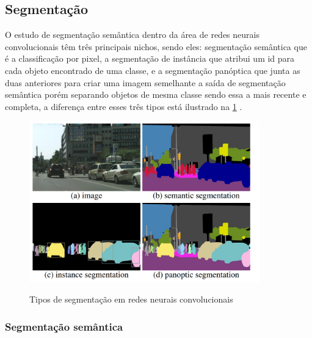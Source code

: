 \subsection{Segmentação}

O estudo de segmentação semântica dentro da área de redes neurais convolucionais têm três principais nichos, sendo eles: segmentação semântica que é a classificação por pixel, a segmentação de instância que atribui um id para cada objeto encontrado de uma classe, e a segmentação panóptica que junta as duas anteriores para criar uma imagem semelhante a saída de segmentação semântica porém separando objetos de mesma classe sendo essa a mais recente e completa, a diferença entre esses três tipos está ilustrado na \cref{fig:segentacoes} \cite{dp_semantic_segmantation, lapix}. 

\begin{figure}[H]
	\caption{Tipos de segmentação em redes neurais convolucionais}
	\centering %
	\includegraphics[width=10cm]{figures/segmantations.png} %
	\label{fig:segentacoes}
\end{figure}

\subsubsection*{Segmentação semântica}

